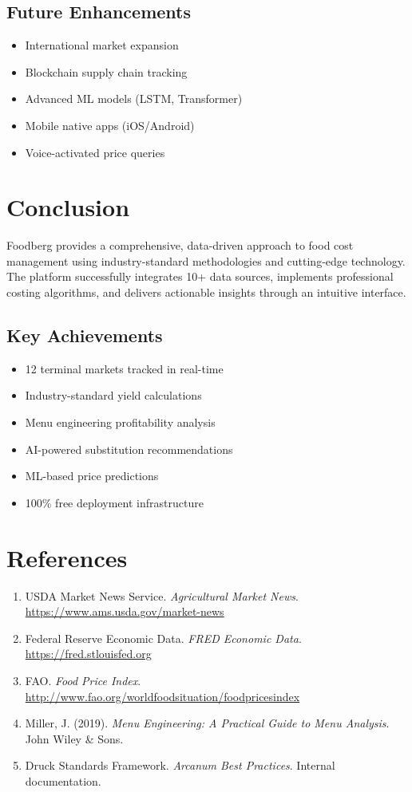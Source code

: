 \documentclass[11pt,a4paper]{article}
\begin{document}
\subsection{Future Enhancements}
\begin{itemize}
    \item International market expansion
    \item Blockchain supply chain tracking
    \item Advanced ML models (LSTM, Transformer)
    \item Mobile native apps (iOS/Android)
    \item Voice-activated price queries
\end{itemize}

\section{Conclusion}

Foodberg provides a comprehensive, data-driven approach to food cost management using industry-standard methodologies and cutting-edge technology. The platform successfully integrates 10+ data sources, implements professional costing algorithms, and delivers actionable insights through an intuitive interface.

\subsection{Key Achievements}
\begin{itemize}
    \item 12 terminal markets tracked in real-time
    \item Industry-standard yield calculations
    \item Menu engineering profitability analysis
    \item AI-powered substitution recommendations
    \item ML-based price predictions
    \item 100\% free deployment infrastructure
\end{itemize}

\section*{References}

\begin{enumerate}
    \item USDA Market News Service. \textit{Agricultural Market News}. \url{https://www.ams.usda.gov/market-news}
    \item Federal Reserve Economic Data. \textit{FRED Economic Data}. \url{https://fred.stlouisfed.org}
    \item FAO. \textit{Food Price Index}. \url{http://www.fao.org/worldfoodsituation/foodpricesindex}
    \item Miller, J. (2019). \textit{Menu Engineering: A Practical Guide to Menu Analysis}. John Wiley \& Sons.
    \item Druck Standards Framework. \textit{Arcanum Best Practices}. Internal documentation.
\end{enumerate}
\end{document}
